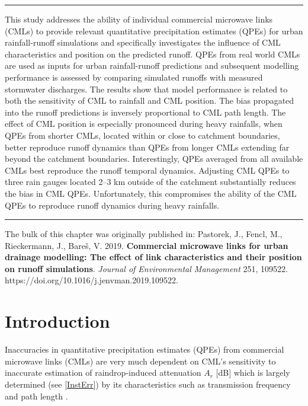 \documentclass{ctuthesis}\usepackage[]{graphicx}\usepackage[]{color}
\begin{document}
\rule{\textwidth}{0.4pt}
This study addresses the ability of individual commercial microwave links (CMLs) to provide relevant quantitative precipitation estimates (QPEs) for urban rainfall-runoff simulations and specifically investigates the influence of CML characteristics and position on the predicted runoff. QPEs from real world CMLs are used as inputs for urban rainfall-runoff predictions and subsequent modelling performance is assessed by comparing simulated runoffs with measured stormwater discharges. The results show that model performance is related to both the sensitivity of CML to rainfall and CML position. The bias propagated into the runoff predictions is inversely proportional to CML path length. The effect of CML position is especially pronounced during heavy rainfalls, when QPEs from shorter CMLs, located within or close to catchment boundaries, better reproduce runoff dynamics than QPEs from longer CMLs extending far beyond the catchment boundaries. Interestingly, QPEs averaged from all available CMLs best reproduce the runoff temporal dynamics. Adjusting CML QPEs to three rain gauges located 2--3 km outside of the catchment substantially reduces the bias in CML QPEs. Unfortunately, this compromises the ability of the CML QPEs to reproduce runoff dynamics during heavy rainfalls.
\rule[0.2cm]{\textwidth}{0.4pt}

{\footnotesize The bulk of this chapter was originally published in: \newline
\-\hspace{0.5cm}
Pastorek, J., Fencl, M., Rieckermann, J., Bareš, V. 2019. \textbf{Commercial microwave links for urban drainage modelling: The effect of link characteristics and their position on runoff simulations}. \emph{Journal of Environmental Management} 251, 109522. \newline https://doi.org/10.1016/j.jenvman.2019.109522.
}

\section{Introduction}

Inaccuracies in quantitative precipitation estimates (QPEs) from commercial microwave links (CMLs) are very much dependent on CML's sensitivity to inaccurate estimation of raindrop-induced attenuation $A_r$ [dB] which is largely determined (see \ref{InstErr}) by its characteristics such as transmission frequency and path length \citep{leijnseMicrowaveLinkRainfall2008}.
       
\end{document}
